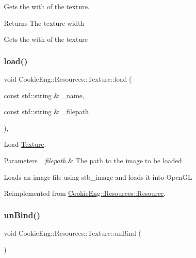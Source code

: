 Gets the with of the texture. 

\begin{DoxyReturn}{Returns}
The texture width
\end{DoxyReturn}
Gets the with of the texture \mbox{\label{class_cookie_eng_1_1_resources_1_1_texture_a1f2d72c781dba6262ac5ca6e8898fc8d}} 
\subsubsection{\texorpdfstring{load()}{load()}}
{\footnotesize\ttfamily void Cookie\+Eng\+::\+Resources\+::\+Texture\+::load (\begin{DoxyParamCaption}\item[{const std\+::string \&}]{\+\_\+name,  }\item[{const std\+::string \&}]{\+\_\+filepath }\end{DoxyParamCaption})\hspace{0.3cm}{\ttfamily [override]}, {\ttfamily [virtual]}}



Load \hyperlink{class_cookie_eng_1_1_resources_1_1_texture}{Texture}. 


\begin{DoxyParams}{Parameters}
{\em \+\_\+filepath} & The path to the image to be loaded\\
\hline
\end{DoxyParams}
Loads an image file using stb\+\_\+image and loads it into Open\+GL 

Reimplemented from \hyperlink{class_cookie_eng_1_1_resources_1_1_resource_a75648b8f2e442bebc90d6eb4ea3a2f6e}{Cookie\+Eng\+::\+Resources\+::\+Resource}.

\mbox{\label{class_cookie_eng_1_1_resources_1_1_texture_a1af11a58e5dc08fa18baeba8cee62109}} 
\subsubsection{\texorpdfstring{un\+Bind()}{unBind()}}
{\footnotesize\ttfamily void Cookie\+Eng\+::\+Resources\+::\+Texture\+::un\+Bind (\begin{DoxyParamCaption}{ }\end{DoxyParamCaption})\hspace{0.3cm}{\ttfamily [inline]}}



